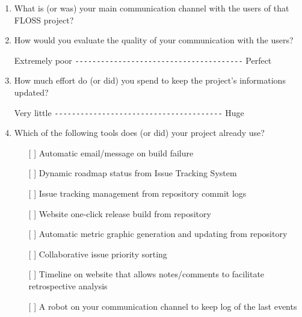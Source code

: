 \documentclass[lnbip]{svmultln}
\begin{document}
\begin{enumerate}
\item What is (or was) your main communication channel with the users
  of that FLOSS project?
  \vspace{10pt}

\item How would you evaluate the quality of your communication with
  the users?

  Extremely poor \verb=---------------------------------------=
  Perfect \vspace{10pt}

\item How much effort do (or did) you spend to keep the project's
  informations updated?

  Very little \verb=---------------------------------------= Huge
  \vspace{10pt}

\item Which of the following tools does (or did) your project already
  use?
  \begin{itemize}
  \item[[ ] ] Automatic email/message on build failure
  \item[[ ] ] Dynamic roadmap status from Issue Tracking System
  \item[[ ] ] Issue tracking management from repository commit logs
  \item[[ ] ] Website one-click release build from repository
  \item[[ ] ] Automatic metric graphic generation and updating from
    repository
  \item[[ ] ] Collaborative issue priority sorting
  \item[[ ] ] Timeline on website that allows notes/comments to
    facilitate retrospective analysis
  \item[[ ] ] A robot on your communication channel to keep log of the
    last events
  \end{itemize}
  \vspace{10pt}


\end{enumerate}
\end{document}
